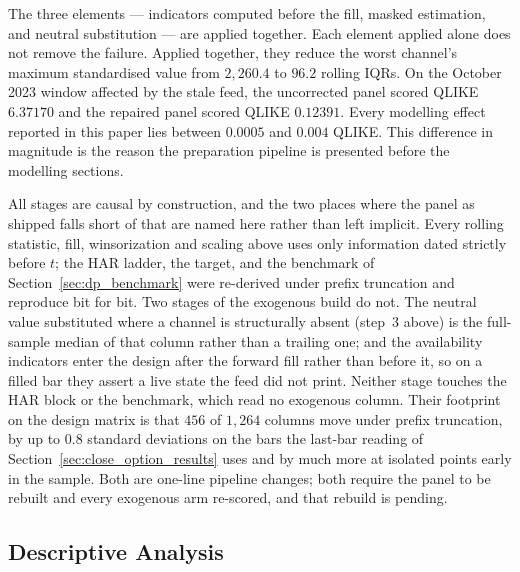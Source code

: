 The three elements --- indicators computed before the fill, masked
estimation, and neutral substitution --- are applied together. Each
element applied alone does not remove the failure. Applied together, they
reduce the worst channel's maximum standardised value from $2{,}260.4$ to
$96.2$ rolling IQRs. On the October 2023 window affected by the stale
feed, the uncorrected panel scored QLIKE $6.37170$ and the repaired panel
scored QLIKE $0.12391$. Every modelling effect reported in this paper lies
between $0.0005$ and $0.004$ QLIKE. This difference in magnitude is the
reason the preparation pipeline is presented before the modelling
sections.

All stages are causal by construction, and the two places where the panel
as shipped falls short of that are named here rather than left implicit.
Every rolling statistic, fill, winsorization and scaling above uses only
information dated strictly before $t$; the HAR ladder, the target, and the
benchmark of Section~\ref{sec:dp_benchmark} were re-derived under prefix
truncation and reproduce bit for bit. Two stages of the exogenous build do
not. The neutral value substituted where a channel is structurally absent
(step~3 above) is the full-sample median of that column rather than a
trailing one; and the availability indicators enter the design after the
forward fill rather than before it, so on a filled bar they assert a live
state the feed did not print. Neither stage touches the HAR block or the
benchmark, which read no exogenous column. Their footprint on the design
matrix is that $456$ of $1{,}264$ columns move under prefix truncation, by
up to $0.8$ standard deviations on the bars the last-bar reading of
Section~\ref{sec:close_option_results} uses and by much more at isolated
points early in the sample. Both are one-line pipeline changes; both
require the panel to be rebuilt and every exogenous arm re-scored, and that
rebuild is pending.

\subsection{Descriptive Analysis}
\label{sec:dp_descriptive}

